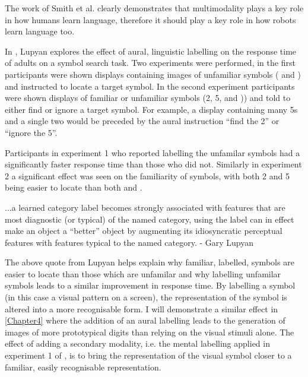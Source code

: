 The work of Smith et al. clearly demonstrates that multimodality plays a key role in how humans learn language, therefore it should play a key role in how robots learn language too.

In \cite{lupyan2007reuniting}, Lupyan explores the effect of aural, linguistic labelling on the response time of adults on a symbol search task. Two experiments were performed, in the first participants were shown displays containing images of  unfamiliar symbols ( and ) and instructed to locate a target symbol. In the second experiment participants were shown displays of familiar or unfamiliar symbols (2, 5,  and )) and told to either find or ignore a target symbol. For example, a display containing many 5s and a single two would be preceded by the aural instruction ``find the 2'' or ``ignore the 5''.

Participants in experiment 1 who reported labelling the unfamilar symbols had a significantly faster response time than those who did not. Similarly in experiment 2 a significant effect was seen on the familiarity of symbols, with both 2 and 5 being easier to locate than both  and .

\begin{displayquote}
...a learned category label becomes
strongly associated with features that are most diagnostic (or
typical) of the named category, using the label can in effect
make an object a “better” object by augmenting its idiosyncratic perceptual features with features typical to the named
category. - Gary Lupyan
\end{displayquote}

The above quote from Lupyan helps explain why familiar, labelled, symbols are easier to locate than those which are unfamilar and why labelling unfamilar symbols leads to a similar improvement in response time. By labelling a symbol (in this case a visual pattern on a screen), the representation of the symbol is altered into a more recognisable form. 
I will demonstrate a similar effect in \autoref{Chapter4} where the addition of an aural labelling leads to the generation of images of more prototypical digits than relying on the visual stimuli alone. The effect of adding a secondary modality, i.e. the mental labelling applied in experiment 1 of \cite{lupyan2007reuniting}, is to bring the representation of the visual symbol closer to a familiar, easily recognisable representation.

